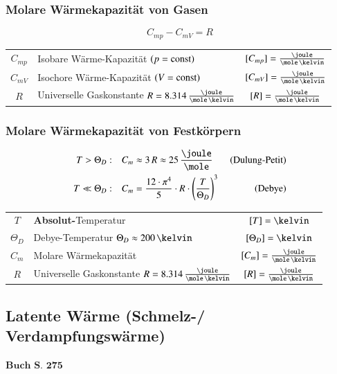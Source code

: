 \subsubsection{Molare Wärmekapazität von Gasen}

\vspace{-0.2cm}

$$ \boxed{ C_{mp} - C_{mV} = R } $$

\renewcommand{\arraystretch}{1.3}
\begin{tabular}{c l c}
	$C_{mp}$ 	& Isobare Wärme-Kapazität $(p = \mathop{} \! \mathrm{const})$ 									& $[C_{mp}] = \frac{\joule}{\mole \, \kelvin}$	\\
	$C_{mV}$ 	& Isochore Wärme-Kapazität $(V = \mathop{} \! \mathrm{const})$ 									& $[C_{mV}] = \frac{\joule}{\mole \, \kelvin}$	\\
	$R$			& Universelle Gaskonstante $R = 8.314 \, \frac{\joule}{\mole \, \kelvin}$ 	& $[R] = \frac{\joule}{\mole \, \kelvin}$
\end{tabular}
\renewcommand{\arraystretch}{1}


\subsubsection{Molare Wärmekapazität von Festkörpern}

\vspace{-0.4cm}

\begin{align*}
	T > \Theta_D: 	\quad &C_m \approx 3 \, R \approx 25 \, \frac{\joule}{\mole}  &\text{ (Dulung-Petit)} \\
	T \ll \Theta_D:	\quad &C_m = \frac{12 \cdot \pi^4}{5}  \cdot R \cdot  \Bigg( \frac{T}{\Theta_D}  \Bigg)^3  &\text{ (Debye)} 
\end{align*}


\renewcommand{\arraystretch}{1.3}
\begin{tabular}{c l c}
	$T$ 		& \textbf{Absolut-}Temperatur 												& $[T] = \kelvin$ 							\\
	$\Theta_D$ 	& Debye-Temperatur $\Theta_D \approx 200 \, \kelvin$ 						& $[\Theta_D] = \kelvin$ 					\\
	$C_m$ 		& Molare Wärmekapazität 													& $[C_m] = \frac{\joule}{\mole \, \kelvin}$ \\
	$R$			& Universelle Gaskonstante $R = 8.314 \, \frac{\joule}{\mole \, \kelvin}$ 	& $[R] = \frac{\joule}{\mole \, \kelvin}$
\end{tabular}
\renewcommand{\arraystretch}{1}


\subsection{Latente Wärme (Schmelz-/ Verdampfungswärme)}
\begin{flushright}
	$\boxed{\textbf{Buch S. 275}}$
\end{flushright}


